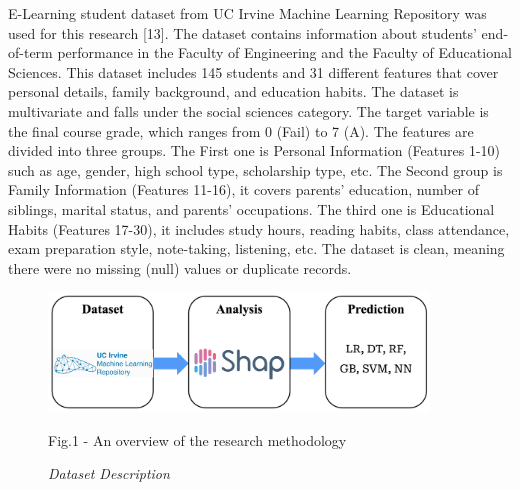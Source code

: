 \begin{multicols}{2}
E-Learning student dataset from UC Irvine Machine Learning Repository
was used for this research {[}13{]}. The dataset contains information
about students'{} end-of-term performance in the Faculty
of Engineering and the Faculty of Educational Sciences. This dataset
includes 145 students and 31 different features that cover personal
details, family background, and education habits. The dataset is
multivariate and falls under the social sciences category. The target
variable is the final course grade, which ranges from 0 (Fail) to 7 (A).
The features are divided into three groups. The First one is Personal
Information (Features 1-10) such as age, gender, high school type,
scholarship type, etc. The Second group is Family Information (Features
11-16), it covers parents'{} education, number of
siblings, marital status, and parents'{} occupations. The
third one is Educational Habits (Features 17-30), it includes study
hours, reading habits, class attendance, exam preparation style,
note-taking, listening, etc. The dataset is clean, meaning there were no
missing (null) values or duplicate records.
\end{multicols}

\begin{figure}[H]
	\centering
	\includegraphics[width=0.9\textwidth]{media/ict/image17}
	\caption*{Fig.1 - An overview of the research methodology}
	\caption*{\emph{Dataset Description}}
\end{figure}

